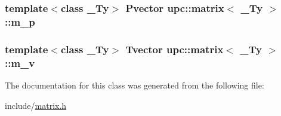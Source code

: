 \subsubsection[{\texorpdfstring{m\+\_\+p}{m_p}}]{\setlength{\rightskip}{0pt plus 5cm}template$<$class \+\_\+\+Ty$>$ {\bf Pvector} {\bf upc\+::matrix}$<$ \+\_\+\+Ty $>$\+::m\+\_\+p\hspace{0.3cm}{\ttfamily [private]}}\hypertarget{classupc_1_1matrix_a01c5df069e0cddf9efcb5632a7e9c220}{}\label{classupc_1_1matrix_a01c5df069e0cddf9efcb5632a7e9c220}
\subsubsection[{\texorpdfstring{m\+\_\+v}{m_v}}]{\setlength{\rightskip}{0pt plus 5cm}template$<$class \+\_\+\+Ty$>$ {\bf Tvector} {\bf upc\+::matrix}$<$ \+\_\+\+Ty $>$\+::m\+\_\+v\hspace{0.3cm}{\ttfamily [private]}}\hypertarget{classupc_1_1matrix_a1fd23b090b8e985c526d913792ad0f96}{}\label{classupc_1_1matrix_a1fd23b090b8e985c526d913792ad0f96}


The documentation for this class was generated from the following file\+:\begin{DoxyCompactItemize}
\item 
include/\hyperlink{matrix_8h}{matrix.\+h}\end{DoxyCompactItemize}
